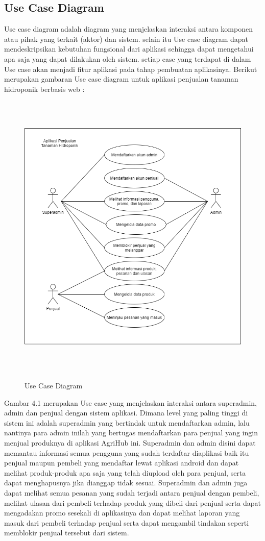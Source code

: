 \subsection{Use Case Diagram}
Use case diagram adalah diagram yang menjelaskan interaksi antara komponen atau pihak yang terkait (aktor) dan sistem. selain itu Use case diagram dapat mendeskripsikan kebutuhan fungsional dari aplikasi sehingga dapat mengetahui apa saja yang dapat dilakukan oleh sistem. setiap case yang terdapat di
dalam Use case akan menjadi fitur aplikasi pada tahap pembuatan aplikasinya. Berikut merupakan gambaran Use case diagram untuk aplikasi penjualan tanaman hidroponik berbasis web :

\begin{figure}[H]
	\centering
	{\includegraphics [width = 14cm, height= 14cm]{gambar/use_case_diagram}}
	\caption{Use Case Diagram}
	\label{use_case_diagram}
\end{figure}

\par Gambar 4.1 merupakan Use case yang menjelaskan interaksi antara superadmin, admin dan penjual dengan sistem aplikasi. Dimana level yang paling tinggi di sistem ini adalah superadmin yang bertindak untuk mendaftarkan admin, lalu nantinya para admin inilah yang bertugas mendaftarkan para penjual yang ingin menjual produknya di aplikasi AgriHub ini. Superadmin dan admin disini dapat memantau informasi semua pengguna yang sudah terdaftar diaplikasi baik itu penjual maupun pembeli yang mendaftar lewat aplikasi android dan dapat melihat produk-produk apa saja yang telah diupload oleh para penjual, serta dapat menghapusnya jika dianggap tidak sesuai. Superadmin dan admin juga dapat melihat semua pesanan yang sudah terjadi antara penjual dengan pembeli, melihat ulasan dari pembeli terhadap produk yang dibeli dari penjual serta dapat mengadakan promo sesekali di aplikasinya dan dapat melihat laporan yang masuk dari pembeli terhadap penjual serta dapat mengambil tindakan seperti memblokir penjual tersebut dari sistem.

